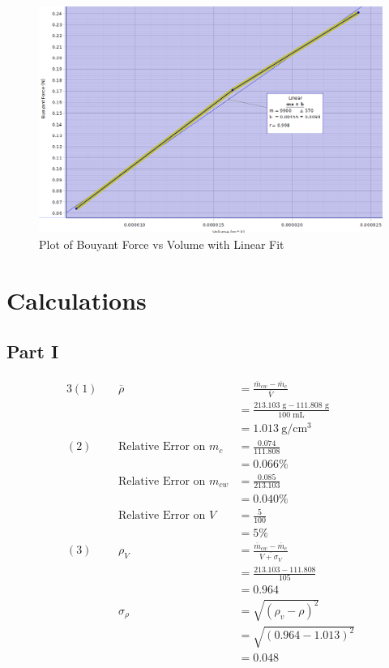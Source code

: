 \documentclass[12pt]{article}
\begin{document}
        \begin{figure}[H]
            \centering
            \includegraphics[width=0.75\linewidth]{linear_fit.png}
            \caption{Plot of Bouyant Force vs Volume with Linear Fit}
        \end{figure}
    \section{Calculations}
        \subsection*{Part I}
        \begin{alignat*}{3}
            (1)~&&
            \overline{\rho} &= \frac{\overline{m}_{cw}-\overline{m}_c}{\overline{V}}\\
            &&&=\frac{213.103 \text{ g} - 111.808 \text{ g} }{100 \text{ mL}}\\
            &&&=1.013 \mathrm{~g/cm^3}\\
            (2)~&&
            \text{Relative Error on } m_c &= \frac{0.074}{111.808}\\
            &&& = 0.066\%\\
            &&\text{Relative Error on } m_{cw} &=\frac{0.085}{213.103}\\ 
            &&&= 0.040\%\\
            &&\text{Relative Error on } V &=\frac{5}{100}\\
            &&& = 5\%\\
            (3)~&&
            \rho_V &= \frac{\overline{m}_{cw}-\overline{m}_c}{\overline{V+\sigma_V}}\\
            &&&=\frac{213.103-111.808}{105}\\
            &&&=0.964\\
            &&\sigma_\rho &= \sqrt{(\rho_v-\rho)^2}\\
            &&&=\sqrt{(0.964-1.013)^2}\\
            &&&=0.048
        \end{alignat*}
\end{document}
